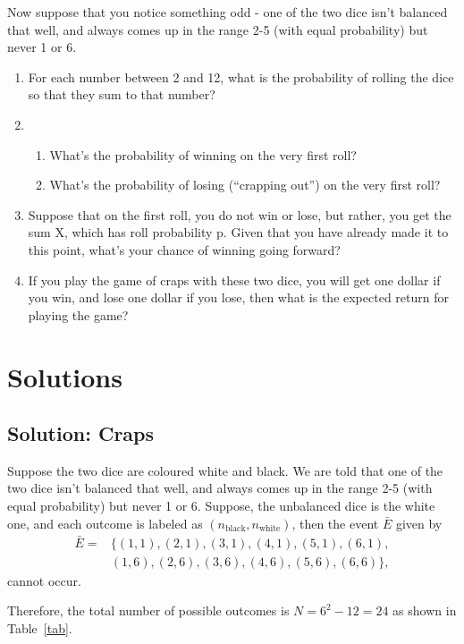 \documentclass[aps,twocolumn,floatfix, nofootinbib, superscriptaddress]{revtex4-1}
\begin{document}
Now suppose that you notice something odd - one of the two dice isn't balanced that well, and always comes up in the range 2-5 (with equal probability) but never 1 or 6.
\begin{enumerate}
\item For each number between 2 and 12, what is the probability of rolling the dice so that they sum to that number?
\item
\begin{enumerate}
\item What’s the probability of winning on the very first roll?
\item What’s the probability of losing (“crapping out”) on the very first roll?
\end{enumerate}
\item Suppose that on the first roll, you do not win or lose, but rather, you get the sum X, which has roll probability p. Given that you have already made it to this point, what’s your chance of winning going forward?
\item If you play the game of craps with these two dice, you will get one dollar if you win, and lose one dollar if you lose, then what is the expected return for playing the game?
\end{enumerate}


\section{Solutions}
\subsection{Solution: Craps}
Suppose the two dice are coloured white and black. We are told that one of the two dice isn't balanced that well, and always comes up in the range 2-5 (with equal probability) but never 1 or 6. Suppose, the unbalanced  dice is the white one, and each outcome is labeled as $(n_{\text{black}}, n_{\text{white}})$, then the event $\bar{E}$ given by 
 \begin{align}
\bar{E} = & \big\{ (1,1), (2,1), (3,1), (4,1), (5,1), (6,1), \nonumber\\&(1,6), (2,6), (3,6), (4,6), (5,6), (6,6)\big\},
\end{align} 
 cannot occur.   
 
 Therefore, the total number of possible outcomes is $N = 6^2 -12 = 24$ as shown in Table~\ref{tab}.
 
\end{document}
